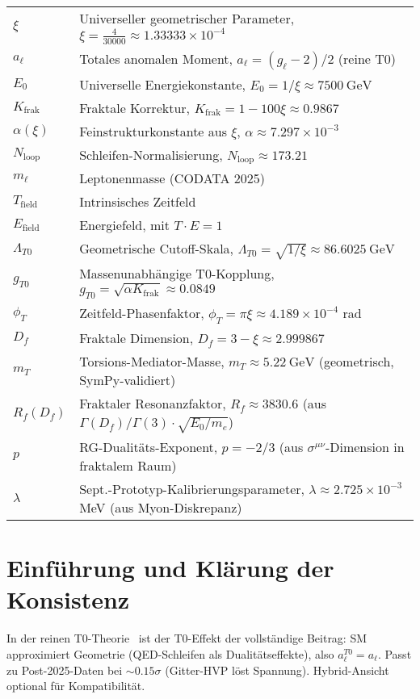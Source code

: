 \documentclass[12pt,a4paper]{article}
\theoremstyle{definition}
\begin{document}
	\begin{tabular}{ll}
		$\xi$ & Universeller geometrischer Parameter, $\xi = \frac{4}{30000} \approx 1.33333 \times 10^{-4}$ \\
		$a_\ell$ & Totales anomalen Moment, $a_\ell = (g_\ell - 2)/2$ (reine T0) \\
		$E_0$ & Universelle Energiekonstante, $E_0 = 1/\xi \approx \SI{7500}{\giga\electronvolt}$ \\
		$K_{\text{frak}}$ & Fraktale Korrektur, $K_{\text{frak}} = 1 - 100 \xi \approx 0.9867$ \\
		$\alpha(\xi)$ & Feinstrukturkonstante aus $\xi$, $\alpha \approx 7.297 \times 10^{-3}$ \\
		$N_{\text{loop}}$ & Schleifen-Normalisierung, $N_{\text{loop}} \approx 173.21$ \\
		$m_\ell$ & Leptonenmasse (CODATA 2025) \\
		$T_{\text{field}}$ & Intrinsisches Zeitfeld \\
		$E_{\text{field}}$ & Energiefeld, mit $T \cdot E = 1$ \\
		$\Lambda_{T0}$ & Geometrische Cutoff-Skala, $\Lambda_{T0} = \sqrt{1/\xi} \approx \SI{86.6025}{\giga\electronvolt}$ \\
		$g_{T0}$ & Massenunabhängige T0-Kopplung, $g_{T0} = \sqrt{\alpha K_{\text{frak}}} \approx 0.0849$ \\
		$\phi_T$ & Zeitfeld-Phasenfaktor, $\phi_T = \pi \xi \approx 4.189 \times 10^{-4}$ rad \\
		$D_f$ & Fraktale Dimension, $D_f = 3 - \xi \approx 2.999867$ \\
		$m_T$ & Torsions-Mediator-Masse, $m_T \approx \SI{5.22}{\giga\electronvolt}$ (geometrisch, SymPy-validiert) \\
		$R_f(D_f)$ & Fraktaler Resonanzfaktor, $R_f \approx 3830.6$ (aus $\Gamma(D_f)/\Gamma(3) \cdot \sqrt{E_0/m_e}$) \\
		$p$ & RG-Dualitäts-Exponent, $p = -2/3$ (aus $\sigma^{\mu\nu}$-Dimension in fraktalem Raum) \\
		$\lambda$ & Sept.-Prototyp-Kalibrierungsparameter, $\lambda \approx 2.725 \times 10^{-3}$ MeV (aus Myon-Diskrepanz) \\
	\end{tabular}
	
	\section{Einführung und Klärung der Konsistenz}
	In der reinen T0-Theorie~\cite{T0_SI} ist der T0-Effekt der vollständige Beitrag: SM approximiert Geometrie (QED-Schleifen als Dualitätseffekte), also $a_\ell^{T0} = a_\ell$. Passt zu Post-2025-Daten bei $\sim 0.15\sigma$ (Gitter-HVP löst Spannung). Hybrid-Ansicht optional für Kompatibilität.
	
\end{document}
